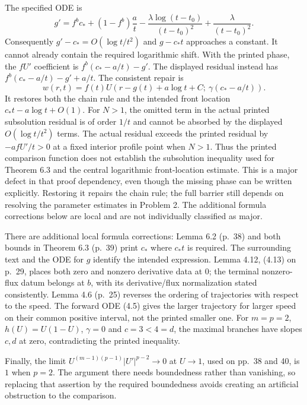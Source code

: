 \documentclass[10pt]{article}
\begin{document}
The specified ODE is \[g'=f^bc_*+(1-f^b)\frac at
 -\frac{\lambda\log(t-t_0)}{(t-t_0)^2}
 +\frac{\lambda}{(t-t_0)^2}.\] Consequently \(g'-c_*=O(\log t/t^2)\) and \(g-c_*t\) approaches a constant. It cannot already contain the required logarithmic shift. With the printed phase, the \(fU'\) coefficient is \(f^b(c_*-a/t)-g'\). The displayed residual instead has \(f^b(c_*-a/t)-g'+a/t\). The consistent repair is \[w(r,t)=f(t)U\!\left(r-g(t)+a\log t+C;\
                    \gamma(c_*-a/t)\right).\] It restores both the chain rule and the intended front location \(c_*t-a\log t+O(1)\). For \(N>1\), the omitted term in the actual printed subsolution residual is of order \(1/t\) and cannot be absorbed by the displayed \(O(\log t/t^2)\) terms. The actual residual exceeds the printed residual by \(-afU'/t>0\) at a fixed interior profile point when \(N>1\). Thus the printed comparison function does not establish the subsolution inequality used for Theorem 6.3 and the central logarithmic front-location estimate. This is a major defect in that proof dependency, even though the missing phase can be written explicitly. Restoring it repairs the chain rule; the full barrier still depends on resolving the parameter estimates in Problem 2. The additional formula corrections below are local and are not individually classified as major.\par
There are additional local formula corrections: Lemma 6.2 (p. 38) and both bounds in Theorem 6.3 (p. 39) print \(c_*\) where \(c_*t\) is required. The surrounding text and the ODE for \(g\) identify the intended expression. Lemma 4.12, (4.13) on p. 29, places both zero and nonzero derivative data at \(0\); the terminal nonzero-flux datum belongs at \(b\), with its derivative/flux normalization stated consistently. Lemma 4.6 (p. 25) reverses the ordering of trajectories with respect to the speed. The forward ODE (4.5) gives the larger trajectory for larger speed on their common positive interval, not the printed smaller one. For \(m=p=2\), \(h(U)=U(1-U)\), \(\gamma=0\) and \(c=3<4=d\), the maximal branches have slopes \(c,d\) at zero, contradicting the printed inequality.\par
Finally, the limit \(U^{(m-1)(p-1)}|U'|^{p-2}\to0\) at \(U\to1\), used on pp. 38 and 40, is \(1\) when \(p=2\). The argument there needs boundedness rather than vanishing, so replacing that assertion by the required boundedness avoids creating an artificial obstruction to the comparison.\par
\end{document}
